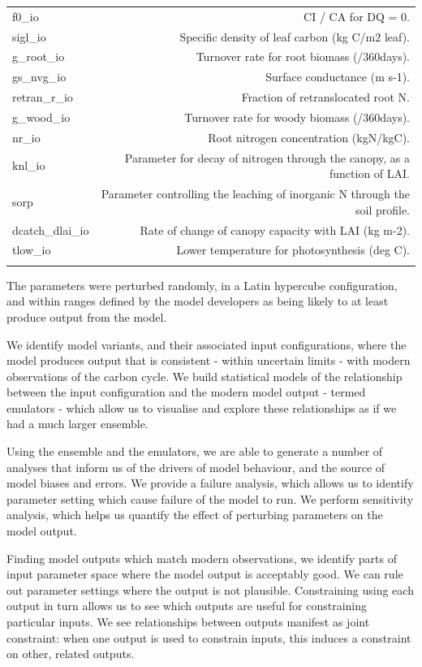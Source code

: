 \documentclass[gmd, manuscript]{copernicus}
\begin{document}
\begin{table}[t]
\begin{tabular}{l r}
  f0\_io & CI / CA for DQ = 0. \\ 
  sigl\_io & Specific density of leaf carbon (kg C/m2 leaf).\\ 
  g\_root\_io & Turnover rate for root biomass (/360days). \\ 
  gs\_nvg\_io & Surface conductance (m s-1). \\ 
  retran\_r\_io & Fraction of retranslocated root N.\\ 
  g\_wood\_io &  Turnover rate for woody biomass (/360days).\\ 
  nr\_io &  Root nitrogen concentration (kgN/kgC).\\ 
  knl\_io & Parameter for decay of nitrogen through the canopy, as a function of LAI.\\ 
  sorp & Parameter controlling the leaching of inorganic N through the soil profile. \\ 
  dcatch\_dlai\_io &Rate of change of canopy capacity with LAI (kg m-2).  \\ 
  tlow\_io & Lower temperature for photosynthesis (deg C).\\  
\bottomhline
\end{tabular}
\belowtable{} %

\end{table}

The parameters were perturbed randomly, in a Latin hypercube configuration, and within ranges defined by the model developers as being likely to at least produce output from the model.

We identify model variants, and their associated input configurations, where the model produces output that is consistent - within uncertain limits - with modern observations of the carbon cycle. We build statistical models of the relationship between the input configuration and the modern model output - termed emulators - which allow us to visualise and explore these relationships as if we had a much larger ensemble.

Using the ensemble and the emulators, we are able to generate a number of analyses that inform us of the drivers of model behaviour, and the source of model biases and errors. We provide a failure analysis, which allows us to identify parameter setting which cause failure of the model to run. We perform sensitivity analysis, which helps us quantify the effect of perturbing parameters on the model output.

Finding model outputs which match modern observations, we identify parts of input parameter space where the model output is acceptably good. We can rule out parameter settings where the output is not plausible. Constraining using each output in turn allows us to see which outputs are useful for constraining particular inputs. We see relationships between outputs manifest as joint constraint: when one output is used to constrain inputs, this induces a constraint on other, related outputs.
\end{document}
